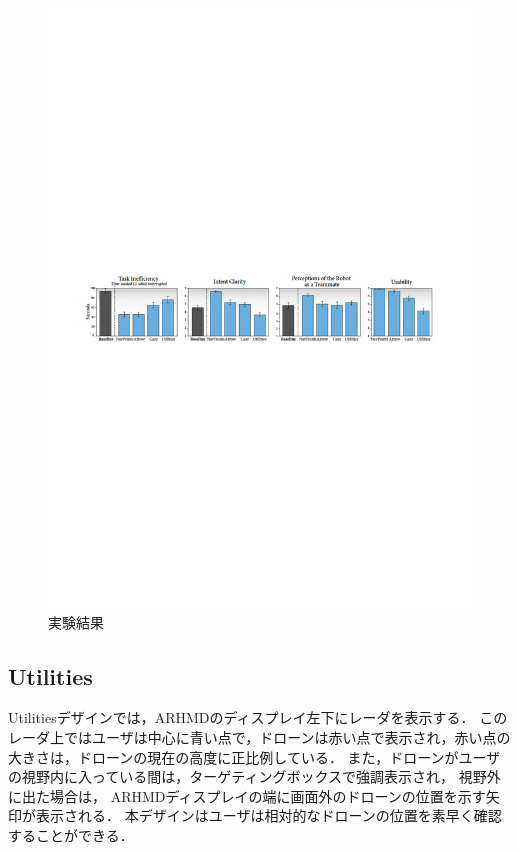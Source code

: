 \documentclass[a4paper,10pt,twocolumn,uplatex]{jsarticle}
\begin{document}
\begin{figure}[!tb]
  \centering
  \includegraphics[width=\linewidth]{img/result.pdf}
  \caption{実験結果}
  \label{fig:result}
  \vspace{-3mm}
\end{figure}


\subsection{Utilities}
Utilitiesデザインでは，ARHMDのディスプレイ左下にレーダを表示する．
このレーダ上ではユーザは中心に青い点で，ドローンは赤い点で表示され，赤い点の大きさは，ドローンの現在の高度に正比例している．
また，ドローンがユーザの視野内に入っている間は，ターゲティングボックスで強調表示され，
視野外に出た場合は，
ARHMDディスプレイの端に画面外のドローンの位置を示す矢印が表示される．
本デザインはユーザは相対的なドローンの位置を素早く確認することができる．
\end{document}
